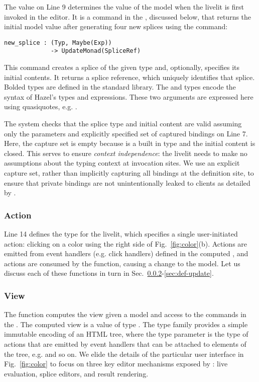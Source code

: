 The  value on Line 9 determines the value of the model
when the livelit is first invoked in the editor.
It is a command in the , discussed below, that returns the 
initial model value after generating four new splices 
using the  command:
\begin{lstlisting}[numbers=none]
new_splice : (Typ, Maybe(Exp)) 
             -> UpdateMonad(SpliceRef)
\end{lstlisting}
This command creates a splice
of the given type and, optionally, specifies its initial contents. 
It returns a splice reference, which uniquely identifies that splice.
Bolded types  
are defined in the standard library. The  and  types 
encode the syntax of Hazel's types and expressions.
These two arguments are expressed here using quasiquotes, e.g.  \cite{bawden1999quasiquotation}. 

The system checks that the splice type and initial content are valid 
assuming only the parameters and explicitly specified set of captured bindings on Line 7.
Here, the capture set is empty because  is a built in type
and the initial content is closed. 
This serves to ensure \emph{context independence}: the livelit needs to make no 
assumptions about the typing context at invocation sites.
We use an explicit capture set, rather than implicitly capturing all bindings 
at the definition site, 
to ensure that private bindings are not unintentionally  
leaked to clients as detailed by \citet{TLMs}.

\subsubsection{Action}
Line 14 defines the  type for the  livelit, which 
specifies a single user-initiated action: clicking on a color using
the right side of Fig.~\ref{fig:color}(b). Actions are emitted
from event handlers (e.g. click handlers) defined in the computed , 
and actions are consumed by the  function, causing a change to the model. 
Let us discuss each of these functions in turn in Sec.~\ref{sec:def-view}-\ref{sec:def-update}.

\subsubsection{View}\label{sec:def-view}
The  function computes the view given a model and access to the commands in 
the . The computed view is a value of type .  
The type family  provides a simple immutable
encoding of an HTML tree, where the type parameter  is the type of actions that 
are emitted by event handlers that can be attached to elements of the tree, e.g.
 and so on. 
We elide the details of the particular user interface in Fig.~\ref{fig:color}
to focus on three key editor mechanisms exposed by : live evaluation,
splice editors, and result rendering.

